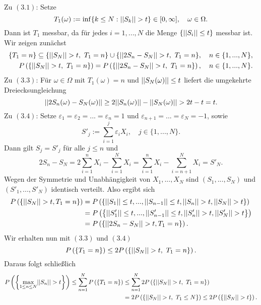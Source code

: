 \begin{proof*}
    Zu $(3.1)$:
    Setze 
    $$
        T_1(\omega) := \inf\{ k \leq N: \lvert\lvert S_k \rvert\rvert > t \} \in [0, \infty], \quad \omega \in \Omega. 
    $$
    Dann ist $T_1$ messbar, da für jedes $i =1,...,N$ die Menge $\{ \lvert\lvert S_i \rvert\rvert \leq t\}$ messbar ist. 
    Wir zeigen zunächst
    \begin{align}
        \{T_1 = n\} \subseteq \{\lvert\lvert S_N \rvert\rvert > t,\  T_1 = n\} \cup \{\lvert\lvert 2S_n - S_N \rvert\rvert>t,\  T_1=n\}, \quad n \in \{1,...,N\}, \\\
        P\left(\left\{ \lvert\lvert S_N \rvert\rvert > t, \ T_1=n \right\}\right) = P\left(\left\{ \lvert\lvert 2S_n - S_N \rvert\rvert > t,\  T_1=n \right\}\right), \quad n \in \{1,...,N\}. 
    \end{align}
    Zu $(3.3)$:
    Für $\omega \in \Omega$ mit $T_1(\omega) = n$ und $\lvert\lvert S_N(\omega) \rvert\rvert \leq t$ liefert die umgekehrte Dreiecksungleichung
    $$
        \lvert\lvert 2S_n(\omega) - S_N(\omega) \rvert\rvert \geq 2\lvert\lvert S_n(\omega) \rvert\rvert - \lvert\lvert S_N(\omega) \rvert\rvert > 2t - t = t. 
    $$
    Zu $(3.4)$: Setze $\varepsilon_1 = \varepsilon_2 = ... = \varepsilon_n = 1$ und $\varepsilon_{n+1} = ... = \varepsilon_N = -1$, sowie
    $$
        S'_j := \sum_{i=1}^j\varepsilon_i X_i, \quad j \in \{1,...,N\}. 
    $$
    Dann gilt $S_j = S'_j$ für alle $j \leq n$ und 
    $$
        2S_n - S_N = 2 \sum_{i=1}^n X_i - \sum_{i=1}^N X_i = \sum_{i=1}^nX_i - \sum_{i=n+1}^N X_i = S'_N. 
    $$
    Wegen der Symmetrie und Unabhängigkeit von $X_1,...,X_N$ sind $(S_1,...,S_N)$ und $(S'_1,...,S'_N)$ identisch verteilt. Also ergibt sich 
    \begin{align*}
        P\left(\left\{ \lvert\lvert S_N \rvert\rvert > t, T_1=n \right\}\right) &= P\left(\left\{ \lvert\lvert S_1 \rvert\rvert \leq t,...,\lvert\lvert S_{n-1} \rvert\rvert\leq t, \lvert\lvert S_n \rvert\rvert > t, \lvert\lvert S_N \rvert\rvert > t \right\}\right) \\\
                                   &= P\left(\left\{ \lvert\lvert S'_1 \rvert\rvert\leq t,...,\lvert\lvert S'_{n-1} \rvert\rvert\leq t, \lvert\lvert S'_n \rvert\rvert > t, \lvert\lvert S'_N \rvert\rvert > t \right\}\right) \\\
                                   &= P\left(\left\{ \lvert\lvert 2S_n - S_N \rvert\rvert > t, T_1=n \right\}\right). 
    \end{align*}
    Wir erhalten nun mit $(3.3)$ und $(3.4)$ 
    $$
        P\left(\left\{ T_1=n \right\}\right) \leq 2 P\left(\left\{ \lvert\lvert S_N \rvert\rvert > t, \ T_1=n \right\}\right).
    $$
   Daraus folgt schließlich
    \begin{align*}
        P\left(\left\{ \max_{1 \leq n \leq N} \lvert\lvert S_n \rvert\rvert > t \right\}\right) \leq \sum_{n=1}^{N} P\left(\left\{ T_1=n \right\}\right) 
                                                     &\leq \sum_{n=1}^N2P\left(\left\{ \lvert\lvert S_N \rvert\rvert >t, \ T_1=n \right\}\right) \\\
                                                     &= 2 P\left(\left\{ \lvert\lvert S_N \rvert\rvert>t, \ T_1 \leq N \right\}\right) \leq 2 P\left(\left\{ \lvert\lvert S_N \rvert\rvert > t \right\}\right). 
    \end{align*}

\end{proof*}
